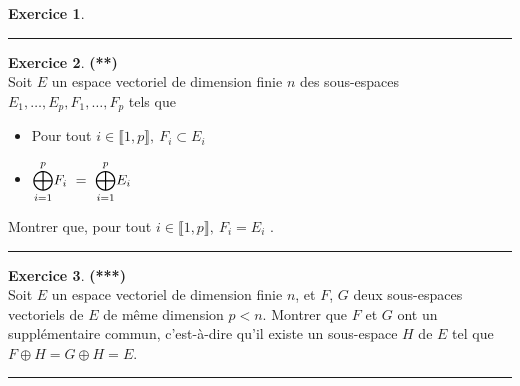 \documentclass[a4paper,11pt]{article}
\theoremstyle{definition}
\newtheorem{exo}{Exercice} %
\begin{document}
\begin{minipage}{1\linewidth}
\begin{minipage}[t]{0.48\linewidth}
\begin{exo}
		\centering\rule{1\linewidth}{0.6pt}\end{exo}
	
		\begin{exo}\textbf{(**)}\quad\\[0.2cm]
		Soit $E$ un espace vectoriel de dimension finie $n$ des sous-espaces $E_1 ,  \dots , E_p , F_1 ,\dots , F_p $ tels que
		\begin{itemize}[$\bullet$]
			\item Pour tout $i \in \llbracket 1, p \rrbracket, \ F_i \subset E_i$
			\item $\mathlarger\bigoplus\limits_{i=1}^p F_i \ = \ \mathlarger\bigoplus\limits_{i=1}^p E_i$
		\end{itemize}
		
		
		Montrer que, pour tout $i \in \llbracket 1, p \rrbracket, \ F_i = E_i$ .
		
		
		\centering\rule{1\linewidth}{0.6pt}\end{exo}
	
			\begin{exo}\textbf{(***)}\quad\\[0.2cm]
		Soit $E$ un espace vectoriel de dimension finie $n$, et $F$, $G$ deux sous-espaces
		vectoriels de $E$ de même dimension $p<n$. Montrer que $F$ et $G$ ont un supplémentaire commun,
		c'est-à-dire qu'il existe un sous-espace $H$ de $E$ tel que $F\oplus H=G\oplus H=E$.
		
		
		\centering\rule{1\linewidth}{0.6pt}\end{exo}
		
\end{minipage}\end{minipage} \newpage
\end{document}
